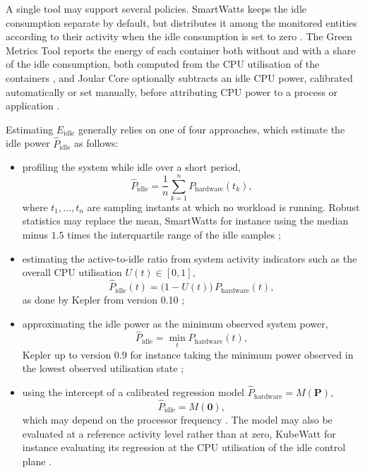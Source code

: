 \documentclass[
  acmsmall,
  screen,
  review,
  xcolor={dvipsnames,usenames}
]{acmart}
\begin{document}
A single tool may support several policies. SmartWatts keeps the idle consumption separate by default, but distributes it among the monitored entities according to their activity when the idle consumption is set to zero \cite{fieniSmartWattsSelfCalibratingSoftwareDefined2020}. The Green Metrics Tool reports the energy of each container both without and with a share of the idle consumption, both computed from the CPU utilisation of the containers \cite{DocsgreencodingioDocsMeasuring}, and Joular Core optionally subtracts an idle CPU power, calibrated automatically or set manually, before attributing CPU power to a process or application \cite{OverviewJoularCore}.

Estimating $E_{\mathrm{idle}}$ generally relies on one of four approaches, which estimate the idle power $\hat{P}_{\mathrm{idle}}$ as follows:

\begin{itemize}
\item profiling the system while idle over a short period,
\[
\hat{P}_{\mathrm{idle}} = \frac{1}{n}\sum_{k=1}^{n} P_{\mathrm{hardware}}(t_k),
\]
where $t_1,\dots,t_n$ are sampling instants at which no workload is running. Robust statistics may replace the mean, SmartWatts for instance using the median minus $1.5$ times the interquartile range of the idle samples \cite{fieniSmartWattsSelfCalibratingSoftwareDefined2020};
\item estimating the active-to-idle ratio from system activity indicators such as the overall CPU utilisation $U(t) \in [0,1]$,
\[
\hat{P}_{\mathrm{idle}}(t) = \bigl(1-U(t)\bigr)\,P_{\mathrm{hardware}}(t),
\]
as done by Kepler from version 0.10 \cite{PowerAttributionKepler};
\item approximating the idle power as the minimum observed system power,
\[
\hat{P}_{\mathrm{idle}} = \min_{t} P_{\mathrm{hardware}}(t),
\]
Kepler up to version 0.9 for instance taking the minimum power observed in the lowest observed utilisation state \cite{SustainablecomputingioKepler2026};
\item using the intercept of a calibrated regression model $\hat{P}_{\mathrm{hardware}} = M(\mathbf{P})$,
\[
\hat{P}_{\mathrm{idle}} = M(\mathbf{0}),
\]
which may depend on the processor frequency \cite{colmantProcesslevelPowerEstimation2015}. The model may also be evaluated at a reference activity level rather than at zero, KubeWatt for instance evaluating its regression at the CPU utilisation of the idle control plane \cite{pijnackerContainerlevelEnergyObservability2025}.
\end{itemize}
\end{document}
